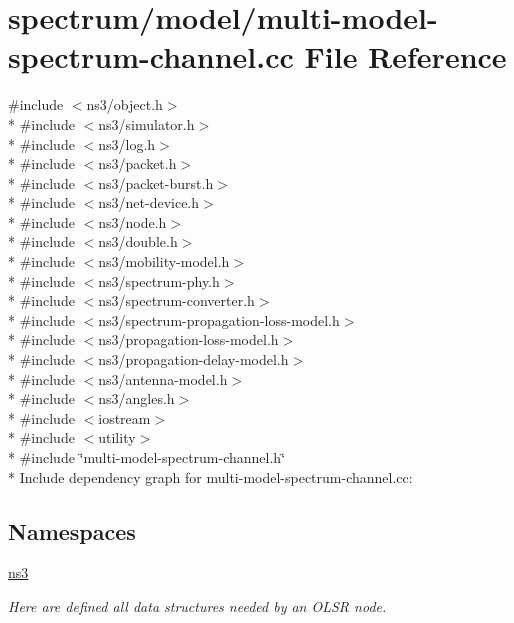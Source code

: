 \hypertarget{multi-model-spectrum-channel_8cc}{}\section{spectrum/model/multi-\/model-\/spectrum-\/channel.cc File Reference}
\label{multi-model-spectrum-channel_8cc}
{\ttfamily \#include $<$ns3/object.\+h$>$}\\*
{\ttfamily \#include $<$ns3/simulator.\+h$>$}\\*
{\ttfamily \#include $<$ns3/log.\+h$>$}\\*
{\ttfamily \#include $<$ns3/packet.\+h$>$}\\*
{\ttfamily \#include $<$ns3/packet-\/burst.\+h$>$}\\*
{\ttfamily \#include $<$ns3/net-\/device.\+h$>$}\\*
{\ttfamily \#include $<$ns3/node.\+h$>$}\\*
{\ttfamily \#include $<$ns3/double.\+h$>$}\\*
{\ttfamily \#include $<$ns3/mobility-\/model.\+h$>$}\\*
{\ttfamily \#include $<$ns3/spectrum-\/phy.\+h$>$}\\*
{\ttfamily \#include $<$ns3/spectrum-\/converter.\+h$>$}\\*
{\ttfamily \#include $<$ns3/spectrum-\/propagation-\/loss-\/model.\+h$>$}\\*
{\ttfamily \#include $<$ns3/propagation-\/loss-\/model.\+h$>$}\\*
{\ttfamily \#include $<$ns3/propagation-\/delay-\/model.\+h$>$}\\*
{\ttfamily \#include $<$ns3/antenna-\/model.\+h$>$}\\*
{\ttfamily \#include $<$ns3/angles.\+h$>$}\\*
{\ttfamily \#include $<$iostream$>$}\\*
{\ttfamily \#include $<$utility$>$}\\*
{\ttfamily \#include \char`\"{}multi-\/model-\/spectrum-\/channel.\+h\char`\"{}}\\*
Include dependency graph for multi-\/model-\/spectrum-\/channel.cc\+:
\subsection*{Namespaces}
\begin{DoxyCompactItemize}
\item 
 \hyperlink{namespacens3}{ns3}
\begin{DoxyCompactList}\small\item\em Here are defined all data structures needed by an O\+L\+SR node. \end{DoxyCompactList}\end{DoxyCompactItemize}
